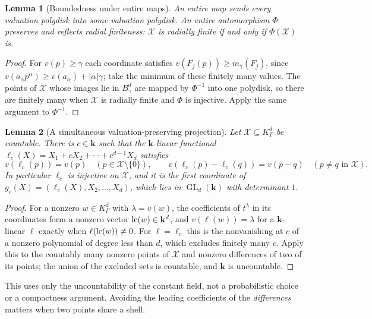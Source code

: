 \documentclass[11pt]{article}
\theoremstyle{plain}
\newtheorem{lemma}[lemma]{Lemma}
\theoremstyle{plain}
\theoremstyle{plain}
\theoremstyle{definition}
\theoremstyle{definition}
\theoremstyle{definition}
\theoremstyle{definition}
\theoremstyle{remark}
\newcommand{\K}{K_\Gamma}\newcommand{\KD}{K_\Delta}
\newcommand{\kk}{\mathbf k}\newcommand{\PP}{\mathbb P}
\begin{document}
\begin{lemma}[Boundedness under entire maps]\label{ent:rc:lem:boundedness}
An entire map sends every valuation polydisk into some valuation polydisk.
An entire automorphism $\Phi$ preserves and reflects radial finiteness:
$\mathcal X$ is radially finite if and only if $\Phi(\mathcal X)$ is.
\end{lemma}
\begin{proof}
For $v(p)\ge\gamma$ each coordinate satisfies $v(F_j(p))\ge m_\gamma(F_j)$,
since $v(a_\alpha p^\alpha)\ge v(a_\alpha)+|\alpha|\gamma$; take the minimum of
these finitely many values. The points of $\mathcal X$ whose images lie in
$B^d_\gamma$ are mapped by $\Phi^{-1}$ into one polydisk, so there are finitely
many when $\mathcal X$ is radially finite and $\Phi$ is injective. Apply the
same argument to $\Phi^{-1}$.
\end{proof}

\begin{lemma}[A simultaneous valuation-preserving projection]
\label{ent:rc:lem:projection}
Let $\mathcal X\subseteq\K^d$ be countable. There is $c\in\kk$ such that the
$\kk$-linear functional $\ell_c(X)=X_1+cX_2+\cdots+c^{d-1}X_d$ satisfies
\begin{equation}\label{ent:rc:eq:project}
 v(\ell_c(p))=v(p)\quad(p\in\mathcal X\setminus\{0\}),\qquad
 v(\ell_c(p)-\ell_c(q))=v(p-q)\quad(p\ne q\text{ in }\mathcal X).
\end{equation}
In particular $\ell_c$ is injective on $\mathcal X$, and it is the first
coordinate of $g_c(X)=(\ell_c(X),X_2,\ldots,X_d)$, which lies in
$\operatorname{GL}_d(\kk)$ with determinant $1$.
\end{lemma}
\begin{proof}
For a nonzero $w\in\K^d$ with $\lambda=v(w)$, the coefficients of $t^\lambda$
in its coordinates form a nonzero vector $\lc(w)\in\kk^d$, and
$v(\ell(w))=\lambda$ for a $\kk$-linear $\ell$ exactly when
$\ell(\operatorname{lc}(w))\ne0$. For $\ell=\ell_c$ this is the nonvanishing
at $c$ of a nonzero polynomial of degree less than $d$, which excludes finitely
many $c$. Apply this to the countably many nonzero points of $\mathcal X$ and
nonzero differences of two of its points; the union of the excluded sets is
countable, and $\kk$ is uncountable.
\end{proof}

This uses only the uncountability of the constant field, not a probabilistic
choice or a compactness argument. Avoiding the leading coefficients of the
\emph{differences} matters when two points share a shell.
\end{document}
